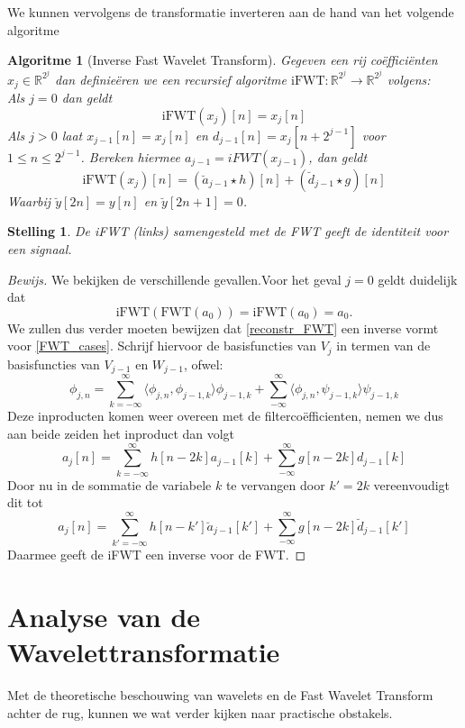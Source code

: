 \documentclass[11pt]{uvamath}
\newcommand{\R}{\mathbb{R}}
\theoremstyle{plain}
\newtheorem{stelling}{Stelling}[chapter]
\newtheorem*{algo}{Algoritme}
\theoremstyle{definition}
\theoremstyle{remark}
\newcommand{\inpr}[2]{\langle #1 , #2 \rangle}
\begin{document}
We kunnen vervolgens de transformatie inverteren aan de hand van het volgende algoritme
\begin{algo}[Inverse Fast Wavelet Transform]
  Gegeven een rij co\"effici\"enten $x_j\in\R^{2^j}$ dan definie\"eren we een recursief
  algoritme $\mathrm{iFWT}:\R^{2^j}\to\R^{2^j}$ volgens:\\
  Als $j=0$ dan geldt
  \[
  \mathrm{iFWT}(x_j)[n] = x_j[n]
  \]
  Als $j>0$ laat $x_{j-1}[n] = x_j[n]$ en $d_{j-1}[n] = x_j[n+2^{j-1}]$ voor
  $1\leq n\leq 2^{j-1}$. Bereken hiermee $a_{j-1} = iFWT(x_{j-1})$,
  dan geldt
  \begin{equation}
    \label{reconstr_FWT}
    \mathrm{iFWT}(x_j)[n] = (\breve a_{j-1}\star h)[n] + (\breve d_{j-1}\star g)[n]
  \end{equation}
  Waarbij $\breve y [2n] = y[n]$ en $\breve y [2n+1] = 0$.
\end{algo}
\begin{stelling}
  De iFWT (links) samengesteld met de FWT geeft de identiteit voor een signaal.
\end{stelling}
\begin{proof}[Bewijs]
  We bekijken de verschillende gevallen.Voor het geval $j=0$ geldt duidelijk dat
  \[
  \mathrm{iFWT}(\mathrm{FWT}(a_0)) = \mathrm{iFWT}(a_0) = a_0.
  \]
  We zullen dus verder moeten bewijzen dat \ref{reconstr_FWT} een inverse vormt voor
  \ref{FWT_cases}.
  Schrijf hiervoor de basisfuncties van $V_j$ in termen van de basisfuncties van $V_{j-1}$
  en $W_{j-1}$, ofwel:
  \[
  \phi_{j,n} = \sum_{k=-\infty}^\infty \inpr{\phi_{j,n}}{\phi_{j-1,k}}\phi_{j-1,k}
  + \sum_{-\infty}^\infty \inpr{\phi_{j,n}}{\psi_{j-1,k}}\psi_{j-1,k}
  \]
  Deze inproducten komen weer overeen met de filterco\"efficienten, nemen we dus aan
  beide zeiden het inproduct dan volgt
  \[
  a_j[n] = \sum_{k=-\infty}^\infty h[n-2k]a_{j-1}[k]
  + \sum_{-\infty}^\infty g[n-2k]d_{j-1}[k]
  \]
  Door nu in de sommatie de variabele $k$ te vervangen door $k'=2k$ vereenvoudigt dit tot
  \[
  a_j[n] = \sum_{k'=-\infty}^\infty h[n-k']\breve a_{j-1}[k']
  + \sum_{-\infty}^\infty g[n-2k]\breve d_{j-1}[k']
  \]
  Daarmee geeft de iFWT een inverse voor de FWT.
\end{proof}
\section{Analyse van de Wavelettransformatie}
Met de theoretische beschouwing van wavelets en de Fast Wavelet Transform achter de rug, kunnen we wat verder kijken naar practische obstakels.
\end{document}

